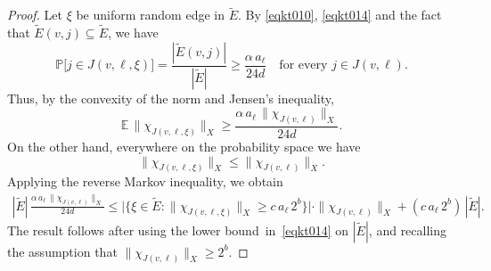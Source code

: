 \documentclass[11pt,leqno]{amsart}
\theoremstyle{remark}
\theoremstyle{plain}
\newcommand{\Exp}{\mathbb{E}}
\def\Prob{{\mathbb P}}
\begin{document}
\begin{proof}
Let $\xi$ be uniform random edge in $\tilde E$. By \eqref{eqkt010}, \eqref{eqkt014} and the fact that
$\tilde{E}(v,j) \subseteq \tilde{E}$, we have
$$ \Prob\big[j\in J(v,\ell,\xi)\big]=\frac{|\tilde E(v,j)|}{|\tilde E|}
\geqslant \frac{\alpha\,a_\ell}{24d} \ \ \ \text{ for every } j\in J(v,\ell). $$
Thus, by the convexity of the norm and Jensen's inequality,
$$ \Exp\,\|\chi_{J(v,\ell,\xi)}\|_X\geqslant \frac{\alpha\,a_\ell\,\|\chi_{J(v,\ell)}\|_X}{24d}. $$
On the other hand, everywhere on the probability space we have
$$ \|\chi_{J(v,\ell,\xi)}\|_X\leqslant \|\chi_{J(v,\ell)}\|_X. $$
Applying the reverse Markov inequality, we obtain
\begin{align*}
|\tilde E| \, \frac{\alpha\,a_\ell\, \|\chi_{J(v,\ell)}\|_X }{24d} \leqslant
\big|\big\{\xi \in \tilde E\colon \|\chi_{J(v,\ell,\xi)}\|_X \ge c\,a_\ell \,2^b \big\}\big| \cdot
\|\chi_{J(v,\ell)}\|_X + (c\,a_\ell\, 2^b)\,|\tilde E|.
\end{align*}
The result follows after using the lower bound~in~\eqref{eqkt014} on $|\tilde E|$, and recalling the assumption that
$\|\chi_{J(v,\ell)}\|_X \ge 2^b$.
\end{proof}
\end{document}
